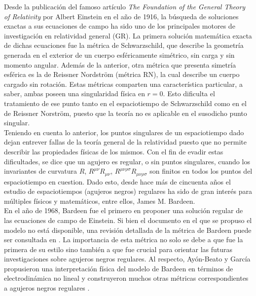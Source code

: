 \documentclass{article}
\numberwithin{equation}{section}
\theoremstyle{definition}
\begin{document}
Desde la publicación del famoso artículo \textit{The Foundation of the General Theory of Relativity} %
por Albert Einstein en el año de 1916, la búsqueda de soluciones exactas a sus ecuaciones de campo ha sido uno de los principales motores de investigación en relatividad general (GR). La primera solución matemática exacta de dichas ecuaciones fue la métrica de Schwarzschild, que describe la geometría generada en el exterior de un cuerpo esféricamente simétrico, sin carga y sin momento angular. Además de la anterior, otra métrica que presenta simetría esférica es la de Reissner Nordström (métrica RN), la cual describe un cuerpo cargado sin rotación. Estas métricas comparten una característica particular, a saber, ambas poseen una singularidad física en $r = 0$. Esto dificulta el tratamiento de ese punto tanto en el espaciotiempo de Schwarzschild como en el de Reissner Norström, puesto que la teoría no es aplicable en el susodicho punto singular.\\

Teniendo en cuenta lo anterior, los puntos singulares de un espaciotiempo dado dejan entrever fallas de la teoría general de la relatividad puesto que no permite describir las propiedades físicas de los mismos. Con el fin de evadir estas dificultades, se dice que un agujero es regular, o sin puntos singulares, cuando los invariantes de curvatura $R$, $R^{\mu \nu}R_{\mu \nu}$, $R^{\mu \nu \rho \sigma}R_{\mu \nu \rho \sigma}$ son finitos en todos los puntos del espaciotiempo en cuestion. Dado esto, desde hace más de cincuenta años el estudio de espaciotiempos (agujeros negros) regulares ha sido de gran interés para múltiples físicos y matemáticos, entre ellos, James M. Bardeen. \\

En el año de 1968, Bardeen fue el primero en proponer una solución regular de las ecuaciones de campo de Einstein. Si bien el documento \cite{bardeen} en el que se propuso el modelo no está disponible, una revisión detallada de la métrica de Bardeen puede ser consultada en \cite{borde1994}. La importancia de esta métrica no solo se debe a que fue la primera de su estilo sino también a que fue crucial para orientar las futuras investigaciones sobre agujeros negros regulares. Al respecto, Ayón-Beato y García propusieron una interpretación física del modelo de Bardeen en términos de electrodinámica no lineal  \cite{ayon-beato2000} y construyeron muchos otras métricas correspondientes a agujeros negros regulares \cite{ayon-beato2005,ayon-beato1999-1,ayon-beato1999-2,ayon-beato1999-3}.\\
\end{document}
